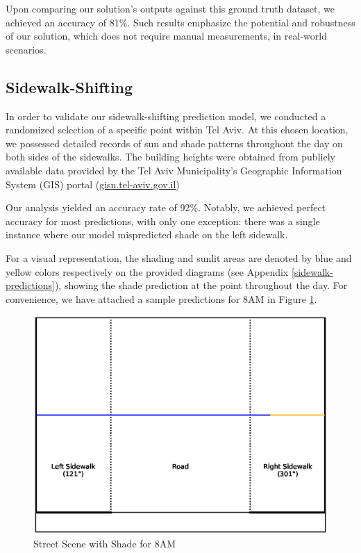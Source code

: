 \documentclass[nohyperref]{article}
\theoremstyle{plain}
\theoremstyle{definition}
\theoremstyle{remark}
\begin{document}
Upon comparing our solution's outputs against this ground truth dataset, we achieved an accuracy of 81\%. Such results emphasize the potential and robustness of our solution, which does not require manual measurements, in real-world scenarios.


\subsection{Sidewalk-Shifting}
\label{sidewalk-shifting-results}
In order to validate our sidewalk-shifting prediction model, we conducted a randomized selection of a specific point within Tel Aviv. At this chosen location, we possessed detailed records of sun and shade patterns throughout the day on both sides of the sidewalks. The building heights were obtained from publicly available data provided by the Tel Aviv Municipality's Geographic Information System (GIS) portal (\url{gisn.tel-aviv.gov.il})

Our analysis yielded an accuracy rate of 92\%. Notably, we achieved perfect accuracy for most predictions, with only one exception: there was a single instance where our model mispredicted shade on the left sidewalk.

For a visual representation, the shading and sunlit areas are denoted by blue and yellow colors respectively on the provided diagrams (see Appendix \ref{sidewalk-predictions}), showing the shade prediction at the point throughout the day. For convenience, we have attached a sample predictions for 8AM in Figure \ref{prediction8}.

\begin{figure}[ht]
\vskip 0.2in
\begin{center}
\centerline{\includegraphics[width=\columnwidth]{sidewalk_predictions/shade_at_8}}
\end{center}
\caption{Street Scene with Shade for 8AM}
\label{prediction8}
\vskip -0.2in
\end{figure}
\end{document}
